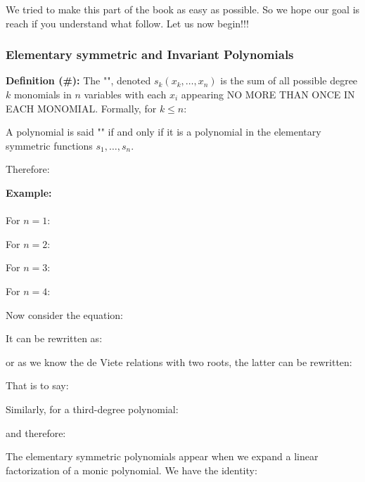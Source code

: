  	We tried to make this part of the book as easy as possible. So we hope our goal is reach if you understand what follow. Let us now begin!!!
 	
 	\subsubsection{Elementary symmetric and Invariant Polynomials}
 	\textbf{Definition (\#\mydef):} The "", denoted $s_k(x_k,\ldots , x_n)$ is the sum of all possible degree $k$ monomials in $n$ variables with each $x_i$ appearing NO MORE THAN ONCE IN EACH MONOMIAL. Formally, for $k\leq n$:
	
	A polynomial is said "" if and only if it is a polynomial in the elementary symmetric functions $s_1,\ldots, s_n$.

	Therefore:
	
	\begin{tcolorbox}[colframe=black,colback=white,sharp corners]
	\textbf{{\Large {}}Example:}\\\\
	For $n = 1$:
	
	For $n = 2$:
	
	For $n = 3$:
	
	For $n = 4$:
	
	Now consider the equation:
	
	It can be rewritten as:
	
	or as we know the de Viete relations with two roots, the latter can be rewritten:
	
		\end{tcolorbox}
	
	\pagebreak
	\begin{tcolorbox}[colframe=black,colback=white,sharp corners]
	That is to say:
	
	Similarly, for a third-degree polynomial:
	
	and therefore:
	
	\end{tcolorbox}

	The elementary symmetric polynomials appear when we expand a linear factorization of a monic polynomial. We have the identity:
	
